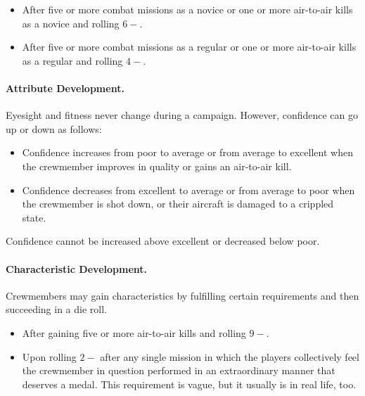 \begin{advancedrules}
{\begin{itemize}
    \item {} After five or more combat missions as a novice or one or more air-to-air kills as a novice and rolling $6-$.

    \item {} After five or more combat missions as a regular or one or more air-to-air kills as a regular and rolling $4-$.

\end{itemize}

\paragraph{Attribute Development.} Eyesight and fitness never change during a campaign. However, confidence can go up or down as follows:
\begin{itemize}

    \item Confidence increases from poor to average or from average to excellent when the crewmember improves in quality or gains an air-to-air kill. 

    \item Confidence decreases from excellent to average or from average to poor when the crewmember is shot down, or their aircraft is damaged to a crippled state. 

\end{itemize}

Confidence cannot be increased above excellent or decreased below poor.

\paragraph{Characteristic Development.}

Crewmembers may gain characteristics by fulfilling certain requirements and then succeeding in a die roll. 

\begin{itemize}

    \item {} After gaining five or more air-to-air kills and rolling $9-$.


    \item {} Upon rolling $2-$ after any single mission in which the players collectively feel the crewmember in question performed in an extraordinary manner that deserves a medal. This requirement is vague, but it usually is in real life, too.


\end{itemize}}
\end{advancedrules}
